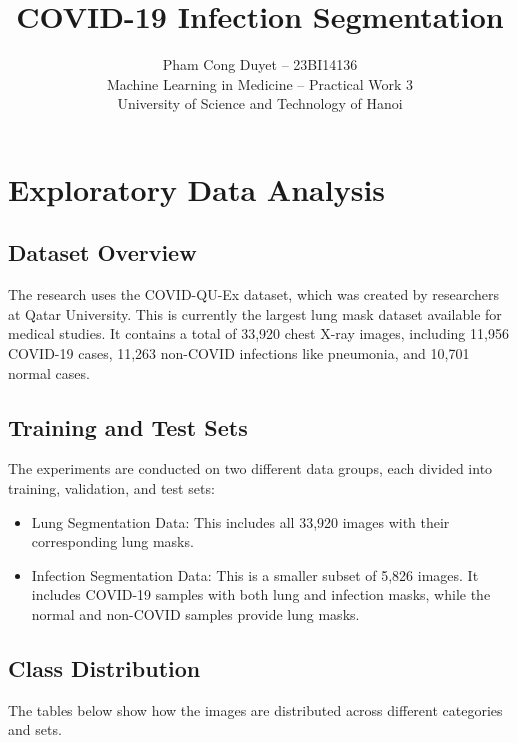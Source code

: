 \documentclass{IEEEtran}
\title{COVID-19 Infection Segmentation}
\author{
Pham Cong Duyet -- 23BI14136\\
Machine Learning in Medicine -- Practical Work 3\\
University of Science and Technology of Hanoi
}
\begin{document}
\maketitle
\section{Exploratory Data Analysis}
\subsection{Dataset Overview}
The research uses the COVID-QU-Ex dataset, which was created by researchers at Qatar University. This is currently the largest lung mask dataset available for medical studies. It contains a total of 33,920 chest X-ray images, including 11,956 COVID-19 cases, 11,263 non-COVID infections like pneumonia, and 10,701 normal cases.
\subsection{Training and Test Sets}
The experiments are conducted on two different data groups, each divided into training, validation, and test sets:
\begin{itemize}
    \item Lung Segmentation Data: This includes all 33,920 images with their corresponding lung masks.
    \item Infection Segmentation Data: This is a smaller subset of 5,826 images. It includes COVID-19 samples with both lung and infection masks, while the normal and non-COVID samples provide lung masks.
\end{itemize}

\subsection{Class Distribution}
The tables below show how the images are distributed across different categories and sets.
\end{document}
